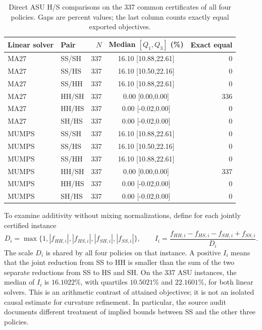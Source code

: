 \documentclass[pdflatex,sn-mathphys-num]{sn-jnl}
\theoremstyle{thmstyleone}
\theoremstyle{thmstylethree}
\begin{document}
\begin{table}[t]
\centering\small
\caption{Direct ASU H/S comparisons on the 337 common certificates of all
four policies. Gaps are percent values; the last column counts exactly
equal exported objectives.}
\label{tab:quartet-four-common}

\begin{tabular}{@{}llrcr@{}}
\toprule
Linear solver & Pair & $N$ & Median $[Q_1,Q_3]$ (\%) & Exact equal\\
\midrule
MA27 & SS/SH & 337 & 16.10 [10.88,22.61] & 0\\
MA27 & SS/HS & 337 & 16.10 [10.50,22.16] & 0\\
MA27 & SS/HH & 337 & 16.10 [10.88,22.61] & 0\\
MA27 & HH/SH & 337 & 0.00 [0.00,0.00] & 336\\
MA27 & HH/HS & 337 & 0.00 [-0.02,0.00] & 0\\
MA27 & SH/HS & 337 & 0.00 [-0.02,0.00] & 0\\
\addlinespace
MUMPS & SS/SH & 337 & 16.10 [10.88,22.61] & 0\\
MUMPS & SS/HS & 337 & 16.10 [10.50,22.16] & 0\\
MUMPS & SS/HH & 337 & 16.10 [10.88,22.61] & 0\\
MUMPS & HH/SH & 337 & 0.00 [0.00,0.00] & 337\\
MUMPS & HH/HS & 337 & 0.00 [-0.02,0.00] & 0\\
MUMPS & SH/HS & 337 & 0.00 [-0.02,0.00] & 0\\
\bottomrule
\end{tabular}


\end{table}

To examine additivity without mixing normalizations, define for each
jointly certified instance
\[
 D_i=\max\{1,|f_{HH,i}|,|f_{HS,i}|,|f_{SH,i}|,|f_{SS,i}|\},\qquad
 I_i=\frac{f_{HH,i}-f_{HS,i}-f_{SH,i}+f_{SS,i}}{D_i}.
\]
The scale $D_i$ is shared by all four policies on that instance. A
positive $I_i$ means that the joint reduction from SS to HH is smaller
than the sum of the two separate reductions from SS to HS and SH.
On the 337 ASU instances, the median of $I_i$ is $16.1022\%$, with
quartiles $10.5021\%$ and $22.1601\%$, for both linear solvers. This
is an arithmetic contrast of attained objectives; it is not an isolated
causal estimate for curvature refinement. In particular, the source
audit documents different treatment of implied bounds between SS and
the other three policies.
\end{document}
